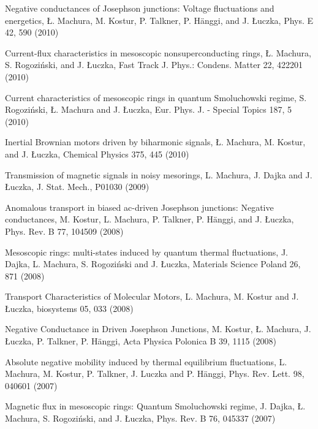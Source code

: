 \begin{etaremune}
\item Negative conductances of Josephson junctions: Voltage fluctuations and energetics, Ł. Machura, M. Kostur, P. Talkner, P. Hänggi, and J. Łuczka, Phys. E 42,  590 (2010)

\item Current-flux characteristics in mesoscopic nonsuperconducting rings, Ł. Machura, S. Rogoziński, and J. Łuczka, Fast Track J. Phys.: Condens. Matter 22,  422201 (2010)

\item Current characteristics of mesoscopic rings in quantum Smoluchowski regime, S. Rogoziński, Ł. Machura and J. Łuczka, Eur. Phys. J. - Special Topics 187,  5 (2010) 

\item Inertial Brownian motors driven by biharmonic signals, Ł. Machura, M. Kostur, and J. Łuczka, Chemical Physics 375,  445 (2010)

\item Transmission of magnetic signals in noisy mesorings, L. Machura, J. Dajka and J. Łuczka, J. Stat. Mech.,  P01030 (2009)

\item Anomalous transport in biased ac-driven Josephson junctions: Negative conductances, M. Kostur, L. Machura, P. Talkner, P. Hänggi, and J. Łuczka, Phys. Rev. B 77,  104509 (2008) 

\item Mesoscopic rings: multi-states induced by quantum thermal fluctuations, J. Dajka, L. Machura, S. Rogoziński and J. Łuczka, Materials Science Poland 26,  871 (2008)

\item Transport Characteristics of Molecular Motors, L. Machura, M. Kostur and J. Łuczka, biosystems 05,  033 (2008)

\item Negative Conductance in Driven Josephson Junctions, M. Kostur, Ł. Machura, J. Łuczka, P. Talkner, P. Hänggi, Acta Physica Polonica B 39,  1115 (2008)

\item Absolute negative mobility induced by thermal equilibrium fluctuations, L. Machura, M. Kostur, P. Talkner, J. Luczka and P. Hänggi, Phys. Rev. Lett. 98,  040601 (2007)

\item Magnetic flux in mesoscopic rings: Quantum Smoluchowski regime, J. Dajka, Ł. Machura, S. Rogoziński, and J. Łuczka, Phys. Rev. B 76,  045337 (2007)


\end{etaremune}
